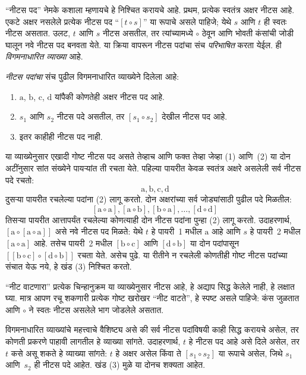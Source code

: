 “नीटस पद” नेमके कशाला म्हणायचे हे निश्चित करायचे आहे. प्रथम, प्रत्येक स्वतंत्र अक्षर नीटस आहे. एकटे अक्षर नसलेले प्रत्येक नीटस पद “$[t \circ s]$” या रूपाचे असले पाहिजे; येथे $s$ आणि $t$ ही स्वतः नीटस असतात. उलट, $t$ आणि $s$ नीटस असतील, तर त्यांच्यामध्ये $\circ$ ठेवून आणि भोवती कंसांची जोडी घालून नवे नीटस पद बनवता येते. या क्रिया वापरून नीटस पदांचा संच \emph{परिभाषित} करता येईल. ही \emph{विगमनाधारित व्याख्या} आहे.

\begin{defn}[नीटस पदे]
\emph{नीटस पदांचा} संच पुढील विगमनाधारित व्याख्येने दिलेला आहे:
\begin{enumerate}
\item $\mathrm{a}$, $\mathrm{b}$, $\mathrm{c}$, $\mathrm{d}$ यांपैकी कोणतेही अक्षर नीटस पद आहे.
\item $s_1$ आणि $s_2$ नीटस पदे असतील, तर $[s_1 \circ s_2]$ देखील नीटस पद आहे.
\item इतर काहीही नीटस पद नाही.
\end{enumerate}
\end{defn}

या व्याख्येनुसार एखादी गोष्ट नीटस पद असते तेव्हाच आणि फक्त तेव्हा जेव्हा (1) आणि~(2) या दोन अटींनुसार सांत संख्येने पायऱ्यांत ती रचता येते. पहिल्या पायरीत केवळ स्वतंत्र अक्षरे असलेली सर्व नीटस पदे रचतो:
\[
\mathrm{a}, \mathrm{b}, \mathrm{c}, \mathrm{d}
\]
दुसऱ्या पायरीत रचलेल्या पदांना (2) लागू करतो. दोन अक्षरांच्या सर्व जोड्यांसाठी पुढील पदे मिळतील:
\[
[\mathrm{a} \circ \mathrm{a}], [\mathrm{a} \circ \mathrm{b}],
[\mathrm{b} \circ \mathrm{a}], \dots, [\mathrm{d} \circ \mathrm{d}]
\]
तिसऱ्या पायरीत आत्तापर्यंत रचलेल्या कोणत्याही दोन नीटस पदांना पुन्हा (2) लागू करतो. उदाहरणार्थ, $[\mathrm{a} \circ [\mathrm{a} \circ \mathrm{a}]]$ असे नवे नीटस पद मिळते: येथे $t$ हे पायरी~1 मधील $\mathrm{a}$ आहे आणि $s$ हे पायरी~2 मधील $[\mathrm{a} \circ \mathrm{a}]$ आहे. तसेच पायरी~2 मधील $[\mathrm{b} \circ \mathrm{c}]$ आणि $[\mathrm{d} \circ \mathrm{b}]$ या दोन पदांपासून $[[\mathrm{b} \circ \mathrm{c}] \circ [\mathrm{d} \circ \mathrm{b}]]$ रचता येते. असेच पुढे. या रीतीने न रचलेली कोणतीही गोष्ट नीटस पदांच्या संचात येऊ नये, हे खंड (3) निश्चित करतो.

“नीट वाटणारा” प्रत्येक चिन्हानुक्रम या व्याख्येनुसार नीटस आहे, हे अद्याप सिद्ध केलेले नाही, हे लक्षात घ्या. मात्र आपण रचू शकणारी प्रत्येक गोष्ट खरोखर “नीट वाटते”, हे स्पष्ट असले पाहिजे: कंस जुळतात आणि $\circ$ ने स्वतः नीटस असलेले भाग जोडलेले असतात.

विगमनाधारित व्याख्यांचे महत्त्वाचे वैशिष्ट्य असे की सर्व नीटस पदांविषयी काही सिद्ध करायचे असेल, तर कोणती प्रकरणे पाहावी लागतील हे व्याख्या सांगते. उदाहरणार्थ, $t$ हे नीटस पद आहे असे दिले असेल, तर $t$ कसे असू शकते हे व्याख्या सांगते: $t$ हे अक्षर असेल किंवा ते $[s_1 \circ s_2]$ या रूपाचे असेल, जिथे $s_1$ आणि~$s_2$ ही नीटस पदे आहेत. खंड (3) मुळे या दोनच शक्यता आहेत.

